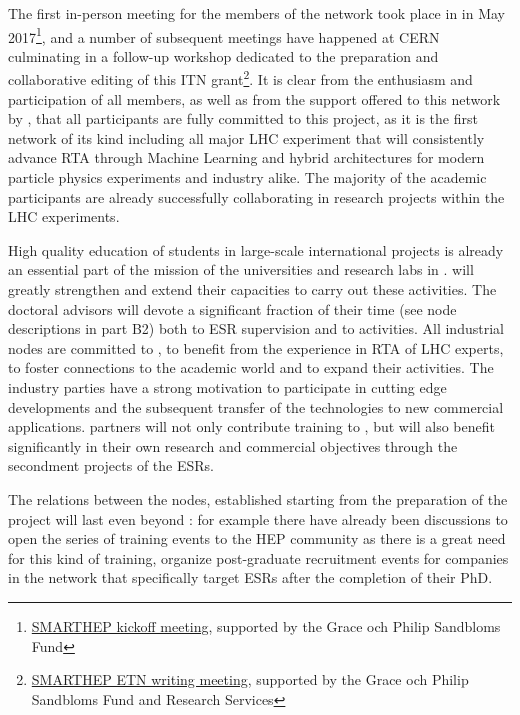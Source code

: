 The first in-person meeting for the members of the \acronym network took place in \lundentity 
in May 2017\footnote{\href{https://indico.lucas.lu.se/event/656/}{SMARTHEP kickoff meeting}, supported by the Grace och Philip Sandbloms Fund}, and a
number of subsequent meetings have happened at CERN culminating in a follow-up 
workshop dedicated to the preparation and collaborative editing of this ITN
grant\footnote{\href{https://indico.lucas.lu.se/event/775/}{SMARTHEP ETN writing meeting}, 
supported by the Grace och Philip Sandbloms Fund and \lundentity Research Services}. 
It is clear from the enthusiasm and participation of all members, as well
as from the support offered to this network by \lundentity, that all \acronym
participants are fully committed to this project, as 
it is the first network of its kind including all major LHC experiment
that will consistently advance RTA through
Machine Learning and hybrid architectures for modern particle physics experiments
and industry alike. The majority of the \acronym academic participants are already successfully
collaborating in research projects within the LHC experiments.

High quality education of students in large-scale
international projects is already an essential part of the mission
of the universities and research labs in \acronym. \acronym will
greatly strengthen and extend their capacities to carry out these activities. 
The doctoral advisors will devote a significant fraction of their time
(see node descriptions in part B2) both to ESR supervision and to \acronym activities. 
All industrial nodes are committed to \acronym, to benefit from the experience in RTA of LHC experts, to 
foster connections to the academic world and to expand their activities. 
The industry parties have a strong motivation to participate in cutting edge developments
and the subsequent transfer of the technologies to new commercial applications.
\acronym partners will not only contribute training to \acronym,
but will also benefit significantly in their own research and commercial objectives
through the secondment projects of the ESRs. 

The relations between the nodes,
established starting from the preparation of the project will last even beyond \acronym:
for example there have already been discussions to open the series of training events to the HEP community
as there is a great need for this kind of training, organize post-graduate recruitment 
events for companies in the network that specifically target \acronym ESRs after the completion of their PhD. 

